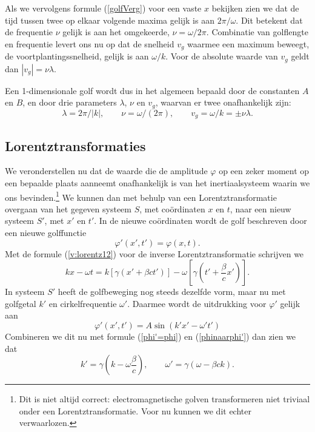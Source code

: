 Als we vervolgens formule (\ref{golfVerg}) voor een vaste $x$ bekijken
zien we dat de tijd tussen twee op elkaar volgende maxima gelijk is
aan $2\pi / \omega$. Dit betekent dat de frequentie $\nu$ gelijk is
aan het omgekeerde, $\nu = \omega / 2\pi$. Combinatie van golflengte
en frequentie levert ons nu op dat de snelheid $v_g$ waarmee een
maximum beweegt, de voortplantingssnelheid, gelijk is aan $ \omega /
k$. Voor de absolute waarde van $v_g$ geldt dan $|v_g| = \nu \lambda$.

Een 1-dimensionale golf wordt dus in het algemeen bepaald door de
constanten $A$ en $B$, en door drie parameters $\lambda$, $\nu$ en
$v_g$, waarvan er twee onafhankelijk zijn:
%
\begin{equation}
\lambda = 2\pi / |k|, \qquad \nu = \omega / (2\pi), \qquad v_g = \omega / k = \pm \nu \lambda.
\end{equation}

\subsection{Lorentztransformaties}

We veronderstellen nu dat de waarde die de amplitude $\varphi$ op een
zeker moment op een bepaalde plaats aanneemt onafhankelijk is van het
inertiaalsysteem waarin we ons bevinden.\footnote{Dit is niet altijd correct: electromagnetische golven
transformeren niet triviaal onder een Lorentztransformatie. Voor nu
kunnen we dit echter verwaarlozen.}  We kunnen dan met behulp van een
Lorentztransformatie overgaan van het gegeven systeem $S$, met
co\"ordinaten $x$ en $t$, naar een nieuw systeem $S'$, met $x'$ en
$t'$. In de nieuwe co\"ordinaten wordt de golf beschreven door een
nieuwe golffunctie
%
\begin{equation} \label{phi'=phi}
\varphi'(x', t') = \varphi(x, t).
\end{equation}
%
Met de formule (\ref{v:lorentz12}) voor de inverse Lorentztransformatie schrijven we 
%
\begin{equation} \label{phinaarphi'}
kx - \omega t = k [\gamma (x' + \beta c t')] - \omega [\gamma (t' + \frac{\beta}{c} x')].
\end{equation}
%
In systeem $S'$ heeft de golfbeweging nog steeds dezelfde vorm, maar nu  met golfgetal $k'$ en cirkelfrequentie $\omega'$. Daarmee wordt de uitdrukking voor $\varphi'$ gelijk aan 
%
\begin{equation}
\varphi'(x',t') = A \sin(k'x' - \omega't')
\end{equation}
%
Combineren we dit nu met formule (\ref{phi'=phi}) en (\ref{phinaarphi'}) dan zien we dat 
%
\begin{equation}
k' = \gamma (k - \omega \frac{\beta}{c}) , \qquad \omega' = \gamma (\omega - \beta c k).
\end{equation}
%

